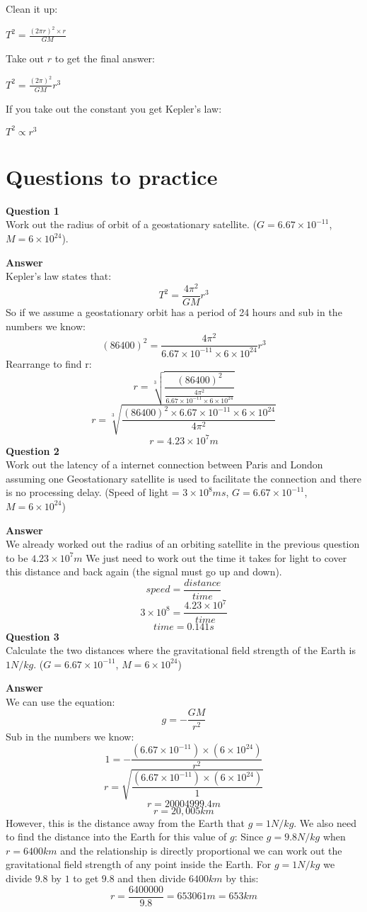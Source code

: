 \documentclass{article}
\begin{document}
Clean it up:

$T^2 = \frac{(2 \pi r)^2 \times r}{GM}$

Take out $r$ to get the final answer:

$T^2 = \frac{(2 \pi)^2}{GM}r^3$

If you take out the constant you get Kepler's law:

$T^2 \propto r^3$

\section*{Questions to practice}
\textbf{Question 1}\\
Work out the radius of orbit of a geostationary satellite. ($G = 6.67 \times 10^{-11}$, $M = 6 \times 10^{24}$).

\textbf{Answer}\\
Kepler's law states that:
\[
	T^2 = \frac{4 \pi ^2}{GM} r^3
\]
So if we assume a geostationary orbit has a period of 24 hours and sub in the numbers we know:
\[
	(86400)^2 = \frac{4 \pi ^2}{6.67 \times 10^{-11} \times 6 \times 10^{24}} r^3
\]
Rearrange to find r:
\[
	r = \sqrt[3]{\frac{(86400)^2}{\frac{4 \pi ^2}{6.67 \times 10^{-11} \times 6 \times 10^{24}}}}
\]
\[
	r = \sqrt[3]{\frac{(86400)^2 \times 6.67 \times 10^{-11} \times 6 \times 10^{24}}{4 \pi ^2}}
\]
\[
	r = 4.23 \times 10^{7}m
\]
\textbf{Question 2}\\
Work out the latency of a internet connection between Paris and London assuming one Geostationary satellite is used to facilitate the connection and there is no processing delay. (Speed of light = $3 \times 10^8 ms$, $G = 6.67 \times 10^{-11}$, $M = 6 \times 10^{24}$)

\textbf{Answer}\\
We already worked out the radius of an orbiting satellite in the previous question to be $4.23 \times 10^{7}m$ We just need to work out the time it takes for light to cover this distance and back again (the signal must go up and down).
\[
	speed = \frac{distance}{time}
\]
\[
	3 \times 10^8 = \frac{4.23 \times 10^{7}}{time}
\]
\[
	time = 0.141s
\]
\textbf{Question 3}\\
Calculate the two distances where the gravitational field strength of the Earth is $1N/kg$. ($G = 6.67 \times 10^{-11}$, $M = 6 \times 10^{24}$)

\textbf{Answer}\\
We can use the equation:
\[
	g = -\frac{GM}{r^2}
\]
Sub in the numbers we know:
\[
	1 = -\frac{(6.67 \times 10^{-11}) \times (6 \times 10^{24})}{r^2}
\]
\[
	r = \sqrt{\frac{(6.67 \times 10^{-11}) \times (6 \times 10^{24})}{1}}
\]
\[
	r = 20004999.4m
\]
\[
	r = 20,005km
\]
However, this is the distance away from the Earth that $g = 1N/kg$. We also need to find the distance into the Earth for this value of $g$:
Since $g = 9.8N/kg$ when $r = 6400km$ and the relationship is directly proportional we can work out the gravitational field strength of any point inside the Earth.
For $g = 1N/kg$ we divide $9.8$ by $1$ to get $9.8$ and then divide $6400km$ by this:
\[
	r = \frac{6400000}{9.8} = 653061m = 653km
\]
\end{document}
